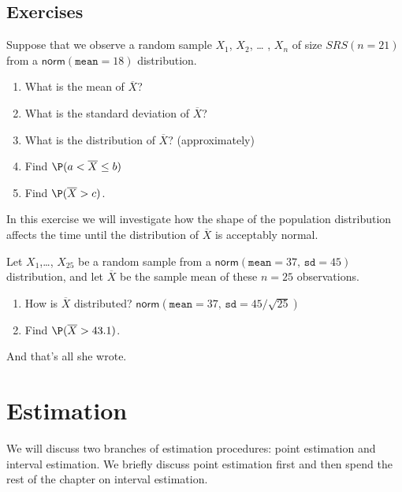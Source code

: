 \documentclass[captions=tableheading]{scrbook}
\begin{document}
\newpage{}
\section{Exercises}
\label{sec-8-6}

\setcounter{thm}{0}



\begin{xca}
Suppose that we observe a random sample \(X_{1}\), \(X_{2}\), \ldots{} , \(X_{n}\) of size \( SRS( n =   21 ) \) from a \( \mathsf{norm}(\mathtt{mean}=  18) \) distribution. 
\begin{enumerate}
\item What is the mean of \(\overline{X}\)?
\item What is the standard deviation of \(\overline{X}\)?
\item What is the distribution of \(\overline{X}\)? (approximately)
\item Find \(\P(a< \overline{X} \leq b)\)
\item Find \(\P(\overline{X} > c)\).
\end{enumerate}
\end{xca}

\begin{xca}
\label{xca:clt123}
In this exercise we will investigate how the shape of the population distribution affects the time until the distribution of \(\overline{X}\) is acceptably normal.
\end{xca}

\begin{xca}
Let \(X_{1}\),\ldots{}, \(X_{25}\) be a random sample from a \(\mathsf{norm}(\mathtt{mean}=37,\,\mathtt{sd}=45)\) distribution, and let \(\overline{X}\) be the sample mean of these \(n=25\) observations.
\begin{enumerate}
\item How is \(\overline{X}\) distributed? 
   \(\mathsf{norm}(\mathtt{mean}=37,\,\mathtt{sd}=45/\sqrt{25})\)
\item Find \(\P(\overline{X} > 43.1)\).
\end{enumerate}
And that's all she wrote.
\end{xca}
\chapter{Estimation}
\label{sec-9}

\label{cha:Estimation}


\noindent We will discuss two branches of estimation procedures: point estimation and interval estimation. We briefly discuss point estimation first and then spend the rest of the chapter on interval estimation.
\end{document}
